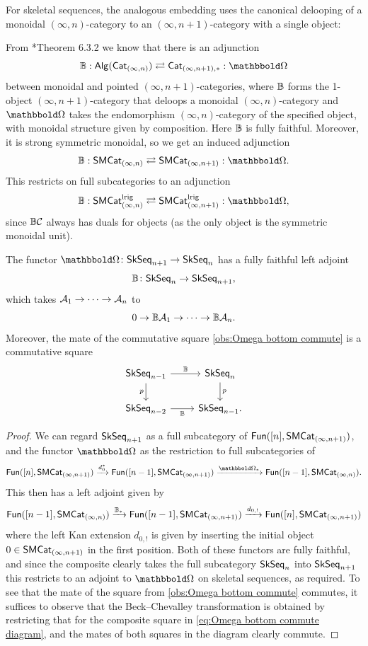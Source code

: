 \documentclass[a4paper,11pt]{article}
\begin{document}
For skeletal sequences, the analogous embedding uses the canonical
delooping of a monoidal $(\infty,n)$-category to an
$(\infty,n+1)$-category with a single object:
\begin{observation}
  From \cite{enr}*{Theorem 6.3.2} we know that there is an adjunction
  \[ \mB : \Alg(\CatIn) \rightleftarrows \Cat_{(\infty,n+1),*} : \mOm\]
  between monoidal \incats{} and pointed $(\infty,n+1)$-categories,
  where $\mathbb{B}$ forms the 1-object $(\infty,n+1)$-category that deloops
  a monoidal $(\infty,n)$-category and $\mOm$ takes the endomorphism
  $(\infty,n)$-category of the specified object, with monoidal
  structure given by composition. Here $\mathbb{B}$ is fully
  faithful. Moreover, it is strong symmetric
  monoidal, so we get an induced adjunction
  \[ \mB : \SMCatIn \rightleftarrows \SMCat_{(\infty,n+1)} :
    \mOm.\]
  This restricts on full subcategories to an adjunction
  \[ \mB : \SMCatIn^{\lrig} \rightleftarrows \SMCat^{\lrig}_{(\infty,n+1)} :
    \mOm,\]
  since $\mathbb{B}\mathcal{C}$ always has duals for objects (as the only object is
  the symmetric monoidal unit). 
\end{observation}

\begin{propn}
  The functor $\mOm \colon \SkSeq_{n+1} \to \SkSeq_{n}$ has a fully faithful left adjoint
  \[\mB \colon \SkSeq_{n} \to \SkSeq_{n+1},\]
  which takes $\nA_{1} \to \cdots \to \nA_{n}$ to
  \[ 0 \to \mB \nA_{1} \to \cdots \to \mB \nA_{n}. \]
  Moreover, the mate of the commutative square \cref{obs:Omega bottom
    commute} is a commutative square
    \[
    \begin{tikzcd}
     \SkSeq_{n-1} \ar[r, "\mB"] \ar[d, "p"'] & \SkSeq_{n}  \ar[d, "p"] \\
     \SkSeq_{n-2} \ar[r, "\mB"'] & \SkSeq_{n-1}.
    \end{tikzcd}
  \]
\end{propn}
\begin{proof}
  We can regard $\textup{\textsf{SkSeq}}_{n+1}$ as a full subcategory of $\textup{\textsf{Fun}}([n],
  \textup{\textsf{SMCat}}_{(\infty,n+1)})$, and the functor $\mOm$ as the restriction
  to full subcategories of
  \[ \Fun([n], \SMCat_{(\infty,n+1)}) \xto{d_{0}^{*}} \Fun([n-1],
    \SMCat_{(\infty,n+1)}) \xto{\mOm_{*}} \Fun([n-1],\SMCatIn).\]
  This then has a left adjoint given by
  \[ \Fun([n-1],\SMCatIn) \xto{\mB_{*}}
    \Fun([n-1],\SMCat_{(\infty,n+1)})
    \xto{d_{0,!}} \Fun([n], \SMCat_{(\infty,n+1)})
  \]
  where the left Kan extension $d_{0,!}$ is given by inserting the
  initial object $0 \in \textup{\textsf{SMCat}}_{(\infty,n+1)}$ in the first
  position. Both of these functors are fully faithful, and since the
  composite clearly takes the full subcategory $\textup{\textsf{SkSeq}}_{n}$ into
  $\textup{\textsf{SkSeq}}_{n+1}$ this restricts to an adjoint to $\mOm$ on skeletal
  sequences, as required. To see that the mate of the square from
  \cref{obs:Omega bottom commute} commutes, it suffices to observe
  that the Beck--Chevalley transformation is obtained by restricting
  that for the composite square in \cref{eq:Omega bottom commute diagram},
  and the mates of both squares in the diagram clearly commute.
\end{proof}
\end{document}
